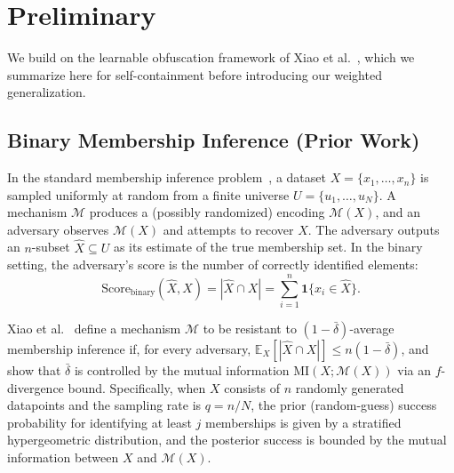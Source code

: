 \documentclass[letterpaper]{article} %
\begin{document}

\section{Preliminary}
\label{sec:preliminary}

We build on the learnable obfuscation framework of Xiao et al.~\cite{xiao2024formal}, which we summarize here for self-containment before introducing our weighted generalization.

\subsection{Binary Membership Inference (Prior Work)}

In the standard membership inference problem~\cite{shokri2017membership,xiao2024formal}, a dataset $X = \{x_1, \ldots, x_n\}$ is sampled uniformly at random from a finite universe $U = \{u_1, \ldots, u_N\}$. A mechanism $\mathcal{M}$ produces a (possibly randomized) encoding $\mathcal{M}(X)$, and an adversary observes $\mathcal{M}(X)$ and attempts to recover $X$. The adversary outputs an $n$-subset $\hat{X} \subseteq U$ as its estimate of the true membership set. In the binary setting, the adversary's score is the number of correctly identified elements:
\begin{equation}\label{eq:binary_score}
\text{Score}_{\text{binary}}(\hat{X}, X)
= |\hat{X} \cap X|
= \sum_{i=1}^n \mathbf{1}\{x_i \in \hat{X}\}.
\end{equation}

Xiao et al.~\cite{xiao2024formal} define a mechanism $\mathcal{M}$ to be resistant to $(1{-}\bar\delta)$-average membership inference if, for every adversary, $\mathbb{E}_X[|\hat{X} \cap X|] \le n(1{-}\bar\delta)$, and show that $\bar\delta$ is controlled by the mutual information $\mathrm{MI}(X; \mathcal{M}(X))$ via an $f$-divergence bound. Specifically, when $X$ consists of $n$ randomly generated datapoints and the sampling rate is $q = n/N$, the prior (random-guess) success probability for identifying at least $j$ memberships is given by a stratified hypergeometric distribution, and the posterior success is bounded by the mutual information between $X$ and $\mathcal{M}(X)$.
\end{document}
